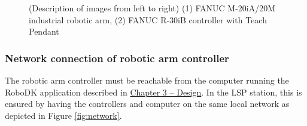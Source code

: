 \begin{figure}[H]
\begin{center}
  \hspace{1cm}
  \caption[Časové odezvy virtuálního modelu vodní nádrže]
    {(Description of images from left to right) (1) FANUC M-20iA/20M industrial robotic arm, (2) FANUC R-30iB controller with Teach Pendant \cite{fanucrobotcontroller}}
  \label{fig:lsplayout}
\end{center}
\end{figure}


\subsubsection*{Network connection of robotic arm controller}


The robotic arm controller must be reachable from the computer running the RoboDK application described in \hyperref[chap:design]{Chapter 3 -- Design}. In the LSP station, this is ensured by having the controllers and computer on the same local network as depicted in Figure \ref{fig:network}. 

